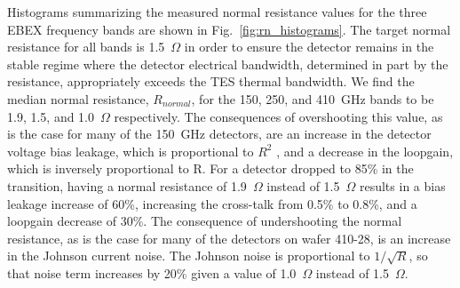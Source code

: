 Histograms summarizing the measured normal resistance values for the three \ac{EBEX} frequency bands are shown in Fig.~\ref{fig:rn_histograms}. 
The target normal resistance for all bands is 1.5~$\Omega$ in order to ensure the detector remains in the stable regime where the detector electrical bandwidth, determined in part by the resistance, appropriately exceeds the \ac{TES} thermal bandwidth. 
We find the median normal resistance, $R_{normal}$, for the 150, 250, and 410~GHz bands to be 1.9, 1.5, and 1.0~$\Omega$ respectively. 
The consequences of overshooting this value, as is the case for many of the 150~GHz detectors, are an increase in the detector voltage bias leakage, which is proportional to $R^2$ \citep{dobbs_revSciInst_2012}, and a decrease in the loopgain, which is inversely proportional to R. 
For a detector dropped to 85\% in the transition, having a normal resistance of 1.9~$\Omega$ instead of 1.5~$\Omega$ results in a bias leakage increase of 60\%, increasing the cross-talk from 0.5\% to 0.8\%, and a loopgain decrease of 30\%. 
The consequence of undershooting the normal resistance, as is the case for many of the detectors on wafer 410-28, is an increase in the Johnson current noise. The Johnson noise is proportional to $1/\sqrt{R}$, so that noise term increases by 20\% given a value of 1.0~$\Omega$ instead of 1.5~$\Omega$.



